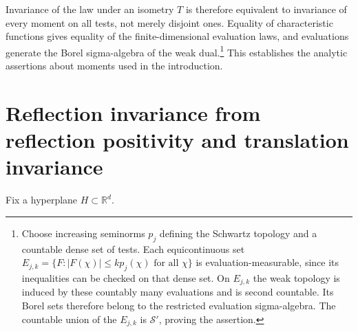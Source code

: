 \documentclass[11pt, letterpaper, reqno]{amsart}
\theoremstyle{definition}
\theoremstyle{remark}
\newcommand{\bbR}{\mathbb{R}}
\newcommand{\calS}{\mathcal{S}}
\begin{document}
Invariance of the law under an isometry $T$ is therefore equivalent
to invariance of every moment on all tests, not merely disjoint
ones. Equality of characteristic functions gives equality of the
finite-dimensional evaluation laws, and evaluations generate the
Borel sigma-algebra of the weak dual.\footnote{Choose increasing
seminorms $p_j$ defining the Schwartz topology and a countable dense
set of tests. Each equicontinuous set
$E_{j,k}=\{F:|F(\chi)|\leq kp_j(\chi)\text{ for all }\chi\}$ is
evaluation-measurable, since its inequalities can be checked on that
dense set. On $E_{j,k}$ the weak topology is induced by these countably
many evaluations and is second countable. Its Borel sets therefore
belong to the restricted evaluation sigma-algebra. The countable
union of the $E_{j,k}$ is $\calS'$, proving the assertion.}
This establishes the analytic assertions about moments used in
the introduction.

\section{Reflection invariance from reflection positivity and translation invariance}

Fix a hyperplane $H\subset\bbR^d$.
\end{document}
